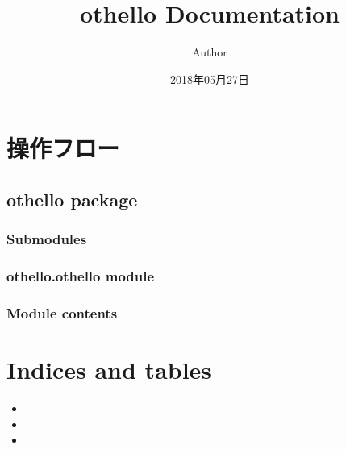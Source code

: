\documentclass[letterpaper,10pt,dvipdfmx]{sphinxmanual}
\title{othello Documentation}
\date{2018年05月27日}
\author{Author}
\begin{document}
\maketitle
\sphinxtableofcontents
{}\label{\detokenize{index::doc}}



\chapter{操作フロー}
\label{\detokenize{index:welcome-to-othello-s-documentation}}\label{\detokenize{index:id1}}
\noindent{}


\section{othello package}
\label{\detokenize{othello:othello-package}}\label{\detokenize{othello::doc}}

\subsection{Submodules}
\label{\detokenize{othello:submodules}}

\subsection{othello.othello module}
\label{\detokenize{othello:othello-othello-module}}

\subsection{Module contents}
\label{\detokenize{othello:module-contents}}

\chapter{Indices and tables}
\label{\detokenize{index:indices-and-tables}}\begin{itemize}
\item {} 

\item {} 

\item {} 

\end{itemize}



\renewcommand{\indexname}{索引}
\printindex
\end{document}
